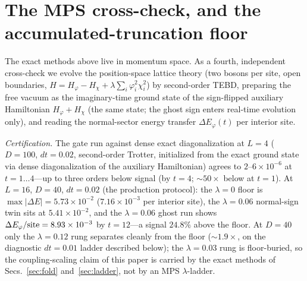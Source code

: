 \documentclass[11pt]{article}
\begin{document}
\section{The MPS cross-check, and the accumulated-truncation floor}
\label{sec:mps}

The exact methods above live in momentum space. As a fourth,
independent cross-check we evolve the position-space lattice
theory (two bosons per site, open boundaries,
$H=H_\varphi-H_\chi+\lambda\sum_i\varphi_i^2\chi_i^2$) by
second-order TEBD, preparing the free vacuum as the
imaginary-time ground state of the sign-flipped auxiliary
Hamiltonian $H_\varphi+H_\chi$ (the same state; the ghost sign
enters real-time evolution only), and reading the normal-sector
energy transfer $\Delta E_\varphi(t)$ per interior site.

\emph{Certification.} The gate run against dense exact
diagonalization at $L=4$ ($D=100$, $dt=0.02$, second-order
Trotter, initialized from the exact ground state via dense
diagonalization of the auxiliary Hamiltonian) agrees to
$2$--$6\times10^{-6}$ at $t=1\ldots4$---up to three orders below
signal (by $t=4$; ${\sim}50\times$ below at $t=1$). At $L=16$, $D=40$, $dt=0.02$ (the production
protocol): the $\lambda=0$ floor is $\max|\Delta E|=5.73\times
10^{-2}$ ($7.16\times10^{-3}$ per interior site), the
$\lambda=0.06$ normal-sign twin sits at $5.41\times10^{-2}$, and
the $\lambda=0.06$ ghost run shows $\Delta E_\varphi/{\rm site}
=8.93\times10^{-3}$ by $t=12$---a signal $24.8\%$ above the floor.
At $D=40$ only the $\lambda=0.12$ rung separates cleanly from
the floor (${\sim}1.9\times$, on the diagnostic $dt=0.01$ ladder
described below); the $\lambda=0.03$ rung is
floor-buried, so the coupling-scaling claim of this paper is
carried by the exact methods of Secs.~\ref{sec:fold}
and~\ref{sec:ladder}, not by an MPS $\lambda$-ladder.
\end{document}
